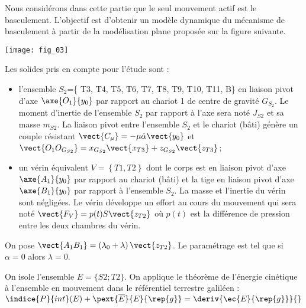 \begin{multicols}{2}
\ifprof
\else

Nous considérons dans cette partie que le seul mouvement actif est le basculement.
L’objectif est d’obtenir un modèle dynamique du mécanisme de basculement à partir de la modélisation plane proposée sur la figure suivante.


\begin{center}
\texttt{[image: fig\_03]}
\end{center}

Les solides pris en compte pour l’étude sont :
\begin{itemize}
\item l'ensemble $S_2$=\{ T3, T4, T5, T6, T7, T8, T9, T10, T11, B\} en liaison pivot d'axe $\axe{O_1}{y_0}$ par rapport au chariot 1 de centre de gravité $G_{S_2}$. Le moment d’inertie de l’ensemble $S_2$ par rapport à l’axe sera noté $J_{S2}$ et sa masse $m_{S2}$. La liaison pivot entre l’ensemble $S_2$ et le chariot (bâti) génère un couple résistant $\vect{C_{\mu}}=-\mu\dot{\alpha}\vect{y_0}$ et $\vect{O_1O_{G_{S2}}}=x_{G_{S2}} \vect{x_{T3}}+z_{G_{S2}} \vect{z_{T3}}$; 
\item un vérin équivalent $V=\left\{ T1,T2\right\}$ dont le corps est en liaison pivot d’axe $\axe{A_1}{y_0}$ par rapport au chariot (bâti) et la tige en liaison pivot d’axe $\axe{B_1}{y_0}$ par rapport à l’ensemble $S_2$. La masse et l’inertie du vérin sont négligées. Le vérin développe un effort au cours du mouvement qui sera noté $\vect{F_V} = p(t) S \vect{z_{T2}}$ où $p(t)$ est la différence de pression entre les deux chambres du vérin.
\end{itemize}


On pose $\vect{A_1B_1} = \left( \lambda_0+\lambda\right)\vect{z_{T2}}$. Le paramétrage est tel que si $\alpha=0$ alors $\lambda=0$.
\fi

%
%


\ifprof
\begin{corrige}
	 On isole l'ensemble $E=\{S2 ; T2\}$. On applique le théorème de l’énergie cinétique à l’ensemble en mouvement dans le référentiel terrestre galiléen : 
$\indice{P}{int}(E)+ \pext{\overline{E}}{E}{\rep{g}} = \deriv{\ec{E}{\rep{g}}}{}$



\end{corrige}
\end{multicols}

